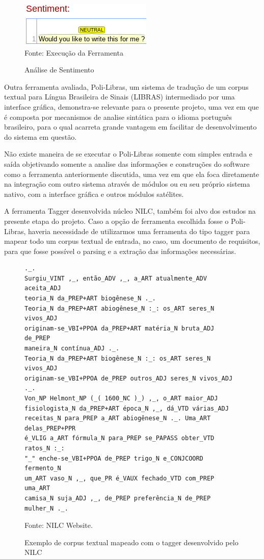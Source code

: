 \begin{figure}[H]
\centering
\caption{Análise de Sentimento} %
\includegraphics[scale=0.9]{11j}\\  %
{\small Fonte: Execução da Ferramenta} %
\label{fig:exemplo} %
\end{figure}

Outra ferramenta avaliada, Poli-Libras, um sistema de tradução de um corpus textual para Língua Brasileira de Sinais (LIBRAS) intermediado por uma interface gráfica, demonstra-se relevante para o presente projeto, uma vez em que é composta por mecanismos de analise sintática para o idioma português brasileiro, para o qual acarreta grande vantagem em facilitar de desenvolvimento do sistema em questão.

Não existe maneira de se executar o Poli-Libras somente com simples entrada e saída objetivando somente a analise das informações e construções do software como a ferramenta anteriormente discutida, uma vez em que ela foca diretamente na integração com outro sistema através de módulos ou eu seu próprio sistema nativo, com a interface gráfica e outros módulos satélites.

A ferramenta Tagger desenvolvida núcleo NILC, também foi alvo dos estudos na presente etapa do projeto. Caso a opção de ferramenta escolhida fosse o Poli-Libras, haveria necessidade de utilizarmos uma ferramenta do tipo tagger para mapear todo um corpus textual de entrada, no caso, um documento de requisitos, para que fosse possível o parsing e a extração das informações necessárias.

\begin{figure}[H]
\centering
\caption{Exemplo de corpus textual mapeado com o tagger desenvolvido pelo NILC} %
\begin{Verbatim}[fontsize=\small]
._.
Surgiu_VINT ,_, então_ADV ,_, a_ART atualmente_ADV aceita_ADJ 
teoria_N da_PREP+ART biogênese_N ._.
Teoria_N da_PREP+ART abiogênese_N :_: os_ART seres_N vivos_ADJ
originam-se_VBI+PPOA da_PREP+ART matéria_N bruta_ADJ de_PREP 
maneira_N contínua_ADJ ._.
Teoria_N da_PREP+ART biogênese_N :_: os_ART seres_N vivos_ADJ 
originam-se_VBI+PPOA de_PREP outros_ADJ seres_N vivos_ADJ ._.
Von_NP Helmont_NP (_( 1600_NC )_) ,_, o_ART maior_ADJ 
fisiologista_N da_PREP+ART época_N ,_, dá_VTD várias_ADJ 
receitas_N para_PREP a_ART abiogênese_N ._. Uma_ART delas_PREP+PPR
é_VLIG a_ART fórmula_N para_PREP se_PAPASS obter_VTD ratos_N :_: 
"_" enche-se_VBI+PPOA de_PREP trigo_N e_CONJCOORD fermento_N 
um_ART vaso_N ,_, que_PR é_VAUX fechado_VTD com_PREP uma_ART 
camisa_N suja_ADJ ,_, de_PREP preferência_N de_PREP mulher_N ._.
\end{Verbatim} 
{\small Fonte: NILC Website.} %
\label{fig:exemploconfig} %
\end{figure}

